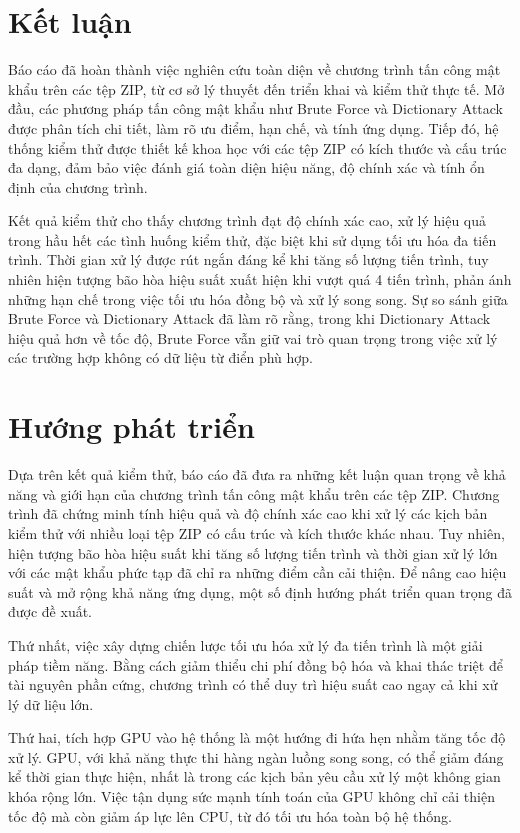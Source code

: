 \documentclass[../DoAn.tex]{subfiles}
\begin{document}
\section{Kết luận}
Báo cáo đã hoàn thành việc nghiên cứu toàn diện về chương trình tấn công mật khẩu trên các tệp ZIP, từ cơ sở lý thuyết đến triển khai và kiểm thử thực tế. Mở đầu, các phương pháp tấn công mật khẩu như Brute Force và Dictionary Attack được phân tích chi tiết, làm rõ ưu điểm, hạn chế, và tính ứng dụng. Tiếp đó, hệ thống kiểm thử được thiết kế khoa học với các tệp ZIP có kích thước và cấu trúc đa dạng, đảm bảo việc đánh giá toàn diện hiệu năng, độ chính xác và tính ổn định của chương trình.

Kết quả kiểm thử cho thấy chương trình đạt độ chính xác cao, xử lý hiệu quả trong hầu hết các tình huống kiểm thử, đặc biệt khi sử dụng tối ưu hóa đa tiến trình. Thời gian xử lý được rút ngắn đáng kể khi tăng số lượng tiến trình, tuy nhiên hiện tượng bão hòa hiệu suất xuất hiện khi vượt quá 4 tiến trình, phản ánh những hạn chế trong việc tối ưu hóa đồng bộ và xử lý song song. Sự so sánh giữa Brute Force và Dictionary Attack đã làm rõ rằng, trong khi Dictionary Attack hiệu quả hơn về tốc độ, Brute Force vẫn giữ vai trò quan trọng trong việc xử lý các trường hợp không có dữ liệu từ điển phù hợp.


\section{Hướng phát triển}

Dựa trên kết quả kiểm thử, báo cáo đã đưa ra những kết luận quan trọng về khả năng và giới hạn của chương trình tấn công mật khẩu trên các tệp ZIP. Chương trình đã chứng minh tính hiệu quả và độ chính xác cao khi xử lý các kịch bản kiểm thử với nhiều loại tệp ZIP có cấu trúc và kích thước khác nhau. Tuy nhiên, hiện tượng bão hòa hiệu suất khi tăng số lượng tiến trình và thời gian xử lý lớn với các mật khẩu phức tạp đã chỉ ra những điểm cần cải thiện. Để nâng cao hiệu suất và mở rộng khả năng ứng dụng, một số định hướng phát triển quan trọng đã được đề xuất.

Thứ nhất, việc xây dựng chiến lược tối ưu hóa xử lý đa tiến trình là một giải pháp tiềm năng. Bằng cách giảm thiểu chi phí đồng bộ hóa và khai thác triệt để tài nguyên phần cứng, chương trình có thể duy trì hiệu suất cao ngay cả khi xử lý dữ liệu lớn.

Thứ hai, tích hợp GPU vào hệ thống là một hướng đi hứa hẹn nhằm tăng tốc độ xử lý. GPU, với khả năng thực thi hàng ngàn luồng song song, có thể giảm đáng kể thời gian thực hiện, nhất là trong các kịch bản yêu cầu xử lý một không gian khóa rộng lớn. Việc tận dụng sức mạnh tính toán của GPU không chỉ cải thiện tốc độ mà còn giảm áp lực lên CPU, từ đó tối ưu hóa toàn bộ hệ thống.
\end{document}
